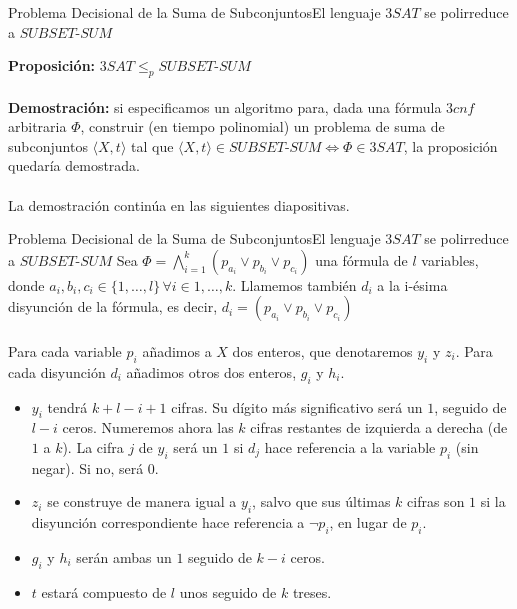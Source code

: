 \documentclass[10pt, envcountsect, presentation, aspectratio=169]{beamer}
\newcommand{\ssum}{\ensuremath{SUBSET\text{-}SUM}}
\begin{document}
\begin{frame}{Problema Decisional de la Suma de Subconjuntos}{El lenguaje $3SAT$ se polirreduce a $\ssum$}

    \textbf{Proposición:} $3SAT \leq_p \ssum$ \\~\\
    \textbf{Demostración:} si especificamos un algoritmo para, dada una fórmula $3cnf$ arbitraria $\Phi$, construir (en tiempo polinomial) un problema de suma de subconjuntos $\langle X, t\rangle$ tal que $\langle X, t\rangle \in \ssum \iff  \Phi \in 3SAT$, la proposición quedaría demostrada.\\~\\
    La demostración continúa en las siguientes diapositivas.
    
\end{frame}
\begin{frame}{Problema Decisional de la Suma de Subconjuntos}{El lenguaje $3SAT$ se polirreduce a $\ssum$}
    Sea $\Phi = \bigwedge_{i=1}^k(p_{a_i} \vee p_{b_i} \vee p_{c_i})$ una fórmula de $l$ variables, donde $a_i,b_i, c_i\in\{1,\dots, l\}\, \forall i \in 1,\dots,k$. Llamemos también $d_i$ a la i-ésima disyunción de la fórmula, es decir, $d_i = (p_{a_i} \vee p_{b_i} \vee p_{c_i})$\\~\\
    Para cada variable $p_i$ añadimos a $X$ dos enteros, que denotaremos $y_i$ y $z_i$. Para cada disyunción $d_i$ añadimos otros dos enteros, $g_i$ y $h_i$.\\
    \begin{itemize}
        \item $y_i$ tendrá $k + l - i + 1$ cifras. Su dígito más significativo será un $1$, seguido de $l-i$ ceros. Numeremos ahora las $k$ cifras restantes de izquierda a derecha (de $1$ a $k$). La cifra $j$ de $y_i$ será un $1$ si $d_j$ hace referencia a la variable $p_i$ (sin negar). Si no, será $0$.
        \item $z_i$ se construye de manera igual a $y_i$, salvo que sus últimas $k$ cifras son $1$ si la disyunción correspondiente hace referencia a $\neg p_i$, en lugar de $p_i$.
        \item $g_i$ y $h_i$ serán ambas un $1$ seguido de $k-i$ ceros.
        \item $t$ estará compuesto de $l$ unos seguido de $k$ treses.
    \end{itemize}
\end{frame}
\end{document}
